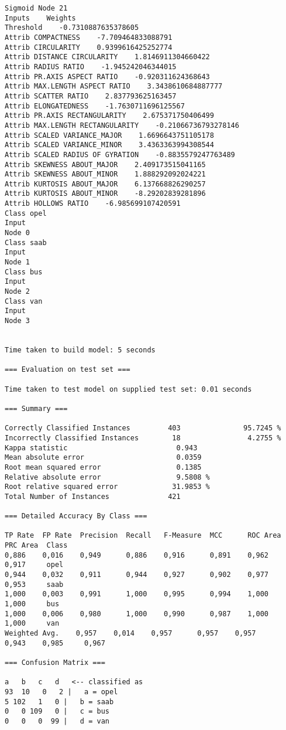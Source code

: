 \documentclass[
	article,			%
	11pt,				%
	oneside,			%
	a4paper,			%
	english,			%
	brazil,				%
	sumario=tradicional
	]{abntex2}
\begin{document}
\begin{lstlisting}
Sigmoid Node 21
Inputs    Weights
Threshold    -0.7310887635378605
Attrib COMPACTNESS    -7.709464833088791
Attrib CIRCULARITY    0.9399616425252774
Attrib DISTANCE CIRCULARITY    1.8146911304660422
Attrib RADIUS RATIO    -1.945242046344015
Attrib PR.AXIS ASPECT RATIO    -0.920311624368643
Attrib MAX.LENGTH ASPECT RATIO    3.3438610684887777
Attrib SCATTER RATIO    2.837793625163457
Attrib ELONGATEDNESS    -1.7630711696125567
Attrib PR.AXIS RECTANGULARITY    2.675371750406499
Attrib MAX.LENGTH RECTANGULARITY    -0.21066736793278146
Attrib SCALED VARIANCE_MAJOR    1.6696643751105178
Attrib SCALED VARIANCE_MINOR    3.4363363994308544
Attrib SCALED RADIUS OF GYRATION    -0.8835579247763489
Attrib SKEWNESS ABOUT_MAJOR    2.409173515041165
Attrib SKEWNESS ABOUT_MINOR    1.888292092024221
Attrib KURTOSIS ABOUT_MAJOR    6.137668826290257
Attrib KURTOSIS ABOUT_MINOR    -8.29202839281896
Attrib HOLLOWS RATIO    -6.985699107420591
Class opel
Input
Node 0
Class saab
Input
Node 1
Class bus
Input
Node 2
Class van
Input
Node 3


Time taken to build model: 5 seconds

=== Evaluation on test set ===

Time taken to test model on supplied test set: 0.01 seconds

=== Summary ===

Correctly Classified Instances         403               95.7245 %
Incorrectly Classified Instances        18                4.2755 %
Kappa statistic                          0.943 
Mean absolute error                      0.0359
Root mean squared error                  0.1385
Relative absolute error                  9.5808 %
Root relative squared error             31.9853 %
Total Number of Instances              421     

=== Detailed Accuracy By Class ===

TP Rate  FP Rate  Precision  Recall   F-Measure  MCC      ROC Area  PRC Area  Class
0,886    0,016    0,949      0,886    0,916      0,891    0,962     0,917     opel
0,944    0,032    0,911      0,944    0,927      0,902    0,977     0,953     saab
1,000    0,003    0,991      1,000    0,995      0,994    1,000     1,000     bus
1,000    0,006    0,980      1,000    0,990      0,987    1,000     1,000     van
Weighted Avg.    0,957    0,014    0,957      0,957    0,957      0,943    0,985     0,967     

=== Confusion Matrix ===

a   b   c   d   <-- classified as
93  10   0   2 |   a = opel
5 102   1   0 |   b = saab
0   0 109   0 |   c = bus
0   0   0  99 |   d = van


\end{lstlisting}
\end{document}
